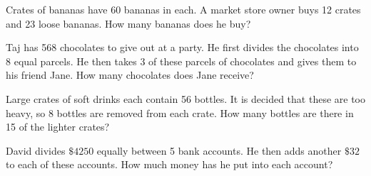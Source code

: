 \begin{exercises}
\begin{questions}
        \Question[2] Crates of bananas have 60 bananas in each. A market store owner buys 12 crates and 23 loose bananas. How many bananas does he buy?
            \begin{solutionorbox}[2in]
            \end{solutionorbox}
        \Question[2] Taj has 568 chocolates to give out at a party. He first divides the chocolates into 8 equal parcels. He then takes 3 of these parcels of chocolates and gives them to his friend Jane. How many chocolates does Jane receive?
            \begin{solutionorbox}[2in]
            \end{solutionorbox}
        \Question[2] Large crates of soft drinks each contain 56 bottles. It is decided that these are too heavy, so 8 bottles are removed from each crate. How many bottles are there in 15 of the lighter crates?
            \begin{solutionorbox}[2in]
            \end{solutionorbox}
        \Question[2] David divides \(\$ 4250\) equally between 5 bank accounts. He then adds another \(\$ 32\) to each of these accounts. How much money has he put into each account?
            \begin{solutionorbox}[2in]
            \end{solutionorbox}
    \end{questions}
\end{exercises}

